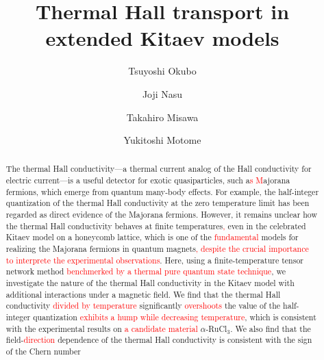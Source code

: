 \documentclass[twocolumn,superscriptaddress,showpacs, longbibliography, aps, prb]{revtex4-2}
\newcommand{\red}[1]{\textcolor{red}{#1}}
\newcommand{\orange}[1]{\textcolor{orange}{#1}}
\begin{document}
\title{Thermal Hall transport in extended Kitaev models}
\author{Tsuyoshi Okubo}
\author{Joji Nasu}
\author{Takahiro Misawa}
\author{Yukitoshi Motome}


\begin{abstract}
The thermal Hall conductivity---a thermal current analog of the Hall conductivity for electric current---is a useful detector for exotic quasiparticles, %
 such a\red{s %
M}ajorana %
fermions, which emerge from quantum many-body effects.
For example, the half-integer quantization of the thermal Hall conductivity at the zero temperature limit
has been regarded as direct evidence of the Majorana %
fermions.
However, it %
remains unclear how the thermal Hall conductivity behaves at finite temperatures\red{,} even %
in the celebrated Kitaev model on a honeycomb lattice, which is one of the %
\red{fundamental} models for realizing the Majorana %
fermions in quantum magnets\red{, despite the crucial importance to interprete the experimental observations}.  
Here, 
using a finite-temperature tensor network method \red{benchmerked by a thermal pure quantum state technique}, we investigate 
the nature of the thermal Hall conductivity in the Kitaev model with additional interactions under a magnetic field.
We find that the thermal Hall conductivity \red{divided by temperature} significantly %
\red{overshoots} the value of the half-integer quantization %
\red{exhibits a hump while decreasing temperature}, which is consistent with
the experimental results %
on \red{a candidate material} $\alpha$-RuCl$_{3}$. 
We also find that the field-\red{direction} %
dependence of the thermal Hall conductivity is
consistent with the sign of the Chern number %

\end{abstract}
\end{document}
